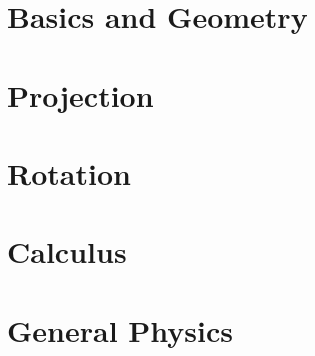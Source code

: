 \part{Basics and Geometry}
   
   
   
   
   
   
   
   
   
   
   
   
   
   
   
   
   
   
   
   

\part{Projection}
   
   
   
   
   
   
   
   

\part{Rotation}
   
   
   
   
   
   
   
   

\part{Calculus}
   
   
   
   
   
   
   
   
   
   

\part{General Physics}
   
   
   
   
   
   
   
   
   
   
   

